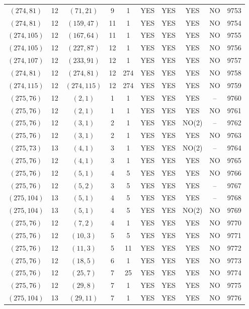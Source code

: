 \begin{longtable}{|c|c|c|c|c|c|c|c|c|c|}
$(274, 81)$ & 12 & $(71, 21)$ & 9 & 1 & YES & YES & YES & NO & 9753\\
$(274, 81)$ & 12 & $(159, 47)$ & 11 & 1 & YES & YES & YES & NO & 9754\\
$(274, 105)$ & 12 & $(167, 64)$ & 11 & 1 & YES & YES & YES & NO & 9755\\
$(274, 105)$ & 12 & $(227, 87)$ & 12 & 1 & YES & YES & YES & NO & 9756\\
$(274, 107)$ & 12 & $(233, 91)$ & 12 & 1 & YES & YES & YES & NO & 9757\\
$(274, 81)$ & 12 & $(274, 81)$ & 12 & 274 & YES & YES & YES & NO & 9758\\
$(274, 115)$ & 12 & $(274, 115)$ & 12 & 274 & YES & YES & YES & NO & 9759\\
$(275, 76)$ & 12 & $(2, 1)$ & 1 & 1 & YES & YES & YES & -- & 9760\\
$(275, 76)$ & 12 & $(2, 1)$ & 1 & 1 & YES & YES & YES & NO & 9761\\
$(275, 76)$ & 12 & $(3, 1)$ & 2 & 1 & YES & YES & NO(2) & -- & 9762\\
$(275, 76)$ & 12 & $(3, 1)$ & 2 & 1 & YES & YES & YES & NO & 9763\\
$(275, 73)$ & 13 & $(4, 1)$ & 3 & 1 & YES & YES & NO(2) & -- & 9764\\
$(275, 76)$ & 12 & $(4, 1)$ & 3 & 1 & YES & YES & YES & NO & 9765\\
$(275, 76)$ & 12 & $(5, 1)$ & 4 & 5 & YES & YES & YES & NO & 9766\\
$(275, 76)$ & 12 & $(5, 2)$ & 3 & 5 & YES & YES & YES & -- & 9767\\
$(275, 104)$ & 13 & $(5, 1)$ & 4 & 5 & YES & YES & YES & -- & 9768\\
$(275, 104)$ & 13 & $(5, 1)$ & 4 & 5 & YES & YES & NO(2) & NO & 9769\\
$(275, 76)$ & 12 & $(7, 2)$ & 4 & 1 & YES & YES & YES & NO & 9770\\
$(275, 76)$ & 12 & $(10, 3)$ & 5 & 5 & YES & YES & YES & NO & 9771\\
$(275, 76)$ & 12 & $(11, 3)$ & 5 & 11 & YES & YES & YES & NO & 9772\\
$(275, 76)$ & 12 & $(18, 5)$ & 6 & 1 & YES & YES & YES & NO & 9773\\
$(275, 76)$ & 12 & $(25, 7)$ & 7 & 25 & YES & YES & YES & NO & 9774\\
$(275, 76)$ & 12 & $(29, 8)$ & 7 & 1 & YES & YES & YES & NO & 9775\\
$(275, 104)$ & 13 & $(29, 11)$ & 7 & 1 & YES & YES & YES & NO & 9776\\

\end{longtable}
